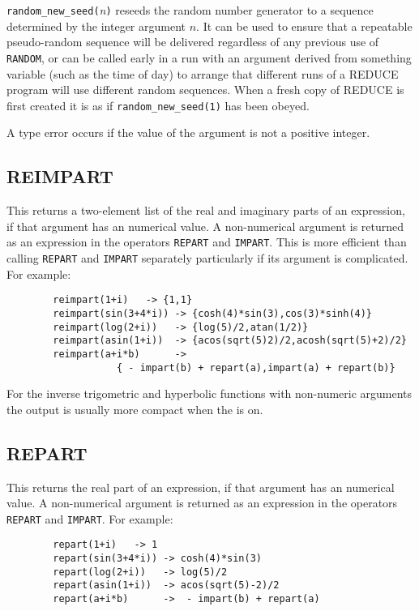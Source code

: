 \texttt{random\_new\_seed(}\emph{n}\texttt{)} reseeds the random number
generator
to a sequence determined by the integer argument $n$.  It can be used to
ensure that a repeatable pseudo-random sequence will be delivered
regardless of any previous use of \texttt{RANDOM}, or can be called early in
a run with an argument derived from something variable (such as the time
of day) to arrange that different runs of a REDUCE program will use
different random sequences.  When a fresh copy of REDUCE is first created
it is as if \texttt{random\_new\_seed(1)} has been obeyed.

A type error occurs if the value of the argument is not a positive integer.

\subsection{REIMPART}
\hypertarget{operator:REIMPART}{}
This returns a two-element list of the real and imaginary parts of an
expression, if that argument has an
numerical value.  A non-numerical argument is returned as an expression in
the operators \texttt{REPART} and \texttt{IMPART}.
This is more efficient than calling \texttt{REPART} and \texttt{IMPART}
separately particularly if its argument is complicated.
For example:
\begin{verbatim}
        reimpart(1+i)   -> {1,1}
        reimpart(sin(3+4*i)) -> {cosh(4)*sin(3),cos(3)*sinh(4)}
        reimpart(log(2+i))   -> {log(5)/2,atan(1/2)}
        reimpart(asin(1+i))  -> {acos(sqrt(5)2)/2,acosh(sqrt(5)+2)/2}
        reimpart(a+i*b)      ->
                   { - impart(b) + repart(a),impart(a) + repart(b)}
\end{verbatim}
For the inverse trigometric and hyperbolic functions with non-numeric arguments the output is usually more compact when the  is on.

\subsection{REPART}
\hypertarget{operator:REPART}{}
This returns the real part of an expression, if that argument has an
numerical value.  A non-numerical argument is returned as an expression in
the operators \texttt{REPART} and \texttt{IMPART}.
For example:
\begin{verbatim}
        repart(1+i)   -> 1
        repart(sin(3+4*i)) -> cosh(4)*sin(3)
        repart(log(2+i))   -> log(5)/2
        repart(asin(1+i))  -> acos(sqrt(5)-2)/2
        repart(a+i*b)      ->  - impart(b) + repart(a)
\end{verbatim}

